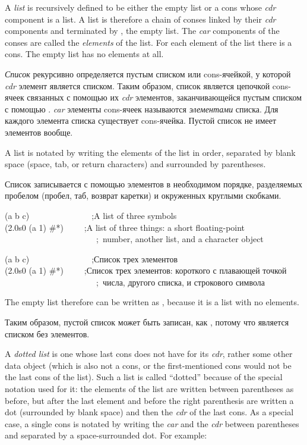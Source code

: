 A {\it list} is recursively defined to be either the empty list
or a cons whose {\it cdr} component is a list.
A list is therefore a chain of conses linked by their {\it cdr} components
and terminated by {\nil}, the empty list.  The {\it car} components of the conses
are called the {\it elements} of the list.  For each element of the list
there is a cons.  The empty list has no elements at all.

{\it Список} рекурсивно определяется пустым списком или cons-ячейкой, у
которой {\it cdr} элемент является списком.
Таким образом, список является цепочкой cons-ячеек связанных с помощью их {\it
  cdr} элементов, заканчивающейся пустым списком с помощью {\nil}. {\it car}
элементы cons-ячеек называются {\it элементами} списка. Для каждого элемента
списка существует cons-ячейка. Пустой список не имеет элементов вообще.

A list is notated by writing the elements of the list in order,
separated by blank space (space, tab, or return characters)
and surrounded by parentheses.

Список записывается с помощью элементов в необходимом порядке, разделяемых
пробелом (пробел, таб, возврат каретки) и окруженных круглыми скобками.
\begin{lisp}
(a b c)~~~~~~~~~~~~~~~;{\rm A list of three symbols} \\
(2.0s0 (a 1) \#{\Xbackslash}*)~~~~~;{\rm A list of three things: a short floating-point} \\
~~~~~~~~~~~~~~~~~~~~~~;~{\rm number, another list, and a character object}
\end{lisp}

\begin{lisp}
(a b c)~~~~~~~~~~~~~~~;{\rm Список трех элементов} \\
(2.0s0 (a 1) \#{\Xbackslash}*)~~~~~;{\rm Список трех элементов: короткого с
  плавающей точкой} \\
~~~~~~~~~~~~~~~~~~~~~~;~{\rm числа, другого списка, и строкового символа}
\end{lisp}
The empty list {\nil} therefore can be written as {\emptylist}, because it is a list
with no elements.

Таким образом, пустой список {\nil} может быть записан, как {\emptylist}, потому что
является списком без элементов.

A {\it dotted list} is one whose last cons does not have {\nil} for
its {\it cdr}, rather some other data object (which is also not a cons,
or the first-mentioned cons would not be the last cons of the list).
Such a list is called ``dotted'' because of the special notation
used for it: the elements of the list are written between
parentheses as before, but after the last element and before
the right parenthesis are written a dot (surrounded by blank space)
and then the {\it cdr} of the last cons.  As a special case,
a single cons is notated by writing the {\it car} and the {\it cdr} between
parentheses and separated by a space-surrounded dot.
For example:

